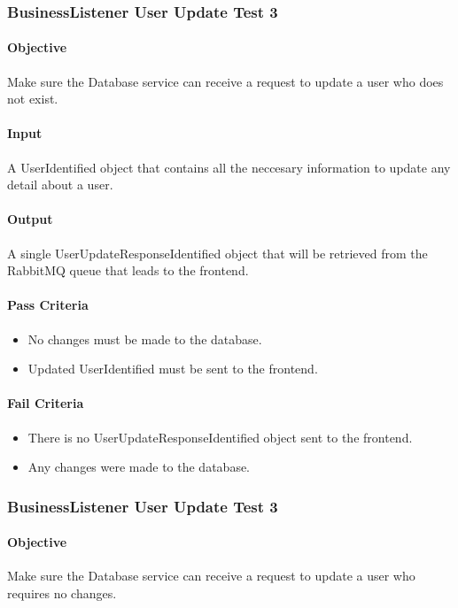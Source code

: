 \documentclass[hidelinks,english]{article}
\begin{document}
			\subsubsection{BusinessListener User Update Test 3}\label{databasebusinesslistenerupdatetest4}
				\paragraph{Objective} Make sure the Database service can receive a request to update a user who does not exist.
				\paragraph{Input} A UserIdentified object that contains all the neccesary information to update any detail about a user.
				\paragraph{Output} A single UserUpdateResponseIdentified object that will be retrieved from the RabbitMQ queue that leads to the frontend.
				\paragraph{Pass Criteria}
				\begin{itemize}
					\item No changes must be made to the database.
					\item Updated UserIdentified must be sent to the frontend.
				\end{itemize}
				\paragraph{Fail Criteria}
				\begin{itemize}
					\item There is no UserUpdateResponseIdentified object sent to the frontend.
					\item Any changes were made to the database.
				\end{itemize}
				
			\subsubsection{BusinessListener User Update Test 3}\label{databasebusinesslistenerupdatetest5}
				\paragraph{Objective} Make sure the Database service can receive a request to update a user who requires no changes.
\end{document}
